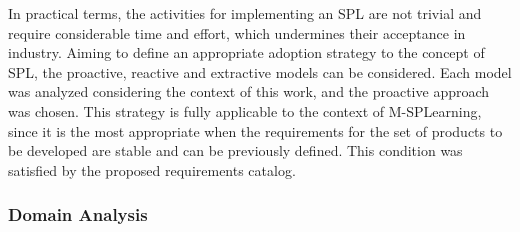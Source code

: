 In practical terms, the activities for implementing an SPL are not trivial and require considerable time and effort, which undermines their acceptance in industry. Aiming to define an appropriate adoption strategy to the concept of SPL, the proactive, reactive and extractive models can be considered.
Each model was analyzed considering the context of this work, and the proactive approach was chosen. This strategy is fully applicable to the context of M-SPLearning, since it is the most appropriate when the requirements for the set of products to be developed are stable and can be previously defined. This condition was satisfied by the proposed requirements catalog.


\subsubsection{Domain Analysis}\label{domainAnalysis}

